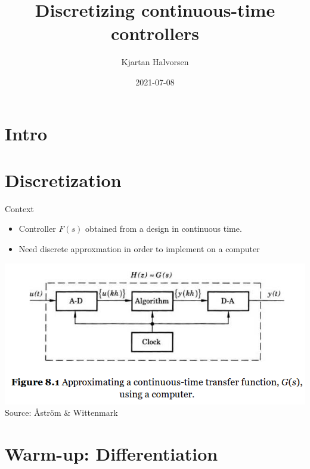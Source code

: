 \documentclass[presentation,aspectratio=1610]{beamer}
\author{Kjartan Halvorsen}
\date{2021-07-08}
\title{Discretizing continuous-time controllers}
\begin{document}
\maketitle


\section{Intro}
\label{sec:org5096880}

\section{Discretization}
\label{sec:org497335f}
\begin{frame}[label={sec:orga5cf6e7}]{Context}
\begin{itemize}
\item Controller \(F(s)\) obtained from a design in continuous time.
\item Need discrete approxmation in order to implement on a computer
\end{itemize}

\begin{center}
 \includegraphics[width=0.7\linewidth]{../../figures/fig8-1.png}\\
 \footnotesize Source: Åström \& Wittenmark 
\end{center}
\end{frame}

\section{Warm-up: Differentiation}
\label{sec:org1fa17cb}
\end{document}
